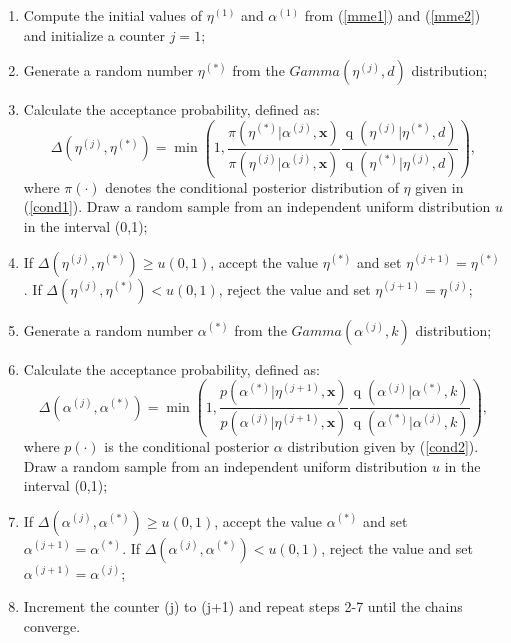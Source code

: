 \documentclass[12pt]{interact}
\newcommand{\f}{\operatorname}
\theoremstyle{plain}%
\theoremstyle{definition}
\theoremstyle{remark}
\begin{document}
\begin{enumerate}
\item Compute the initial values of $\eta^{(1)}$ and $\alpha^{(1)}$ from (\ref{mme1}) and (\ref{mme2}) and initialize a counter $j=1$;
\item Generate a random number $\eta^{(*)}$ from the $Gamma(\eta^{(j)}, d)$ distribution;
\item Calculate the acceptance probability, defined as:
\begin{equation*}
\Delta\left(\eta^{(j)},\eta^{(*)}\right)=\min\left(1, \frac{\pi\left(\eta^{(*)}|\alpha^{(j)},\boldsymbol{x}\right)}{\pi\left(\eta^{(j)}|\alpha^{(j)},\boldsymbol{x}\right)} \frac{\f{q}\left(\eta^{(j)}|\eta^{(*)},d\right)}{\f{q}\left(\eta^{(*)}|\eta^{(j)},d\right)}\right),
\end{equation*}
where $\pi(\cdot)$ denotes the conditional posterior distribution of $\eta$ given in (\ref{cond1}). Draw a random sample from an independent uniform distribution $u$ in the interval (0,1);
\item If $\Delta\left(\eta^{(j)},\eta^{(*)}\right)\geq u(0,1)$, accept the value $\eta^{(*)}$ and set $\eta^{(j+1)}=\eta^{(*)}$. If $\Delta\left(\eta^{(j)},\eta^{(*)}\right)< u(0,1)$, reject the value and set $\eta^{(j+1)}=\eta^{(j)}$;

\item Generate a random number $\alpha^{(*)}$ from the $Gamma(\alpha^{(j)}, k)$ distribution;
\item Calculate the acceptance probability, defined as:
\begin{equation*}
\Delta\left(\alpha^{(j)},\alpha^{(*)}\right)=\min\left(1, \frac{p\left(\alpha^{(*)}|\eta^{(j+1)},\boldsymbol{x}\right)}{p\left(\alpha^{(j)}|\eta^{(j+1)},\boldsymbol{x}\right)} \frac{\f{q}\left(\alpha^{(j)}|\alpha^{(*)},k\right)}{\f{q}\left(\alpha^{(*)}|\alpha^{(j)},k\right)}\right),
\end{equation*}
where $p(\cdot)$ is the conditional posterior $\alpha$ distribution given by (\ref{cond2}). Draw a random sample from an independent uniform distribution $u$ in the interval (0,1);
\item If $\Delta\left(\alpha^{(j)},\alpha^{(*)}\right)\geq u(0,1)$, accept the value $\alpha^{(*)}$ and set $\alpha^{(j+1)}=\alpha^{(*)}$. If $\Delta\left(\alpha^{(j)},\alpha^{(*)}\right)< u(0,1)$, reject the value and set $\alpha^{(j+1)}=\alpha^{(j)}$;

\item Increment the counter (j) to (j+1) and repeat steps 2-7 until the chains converge.
\end{enumerate}
\end{document}

